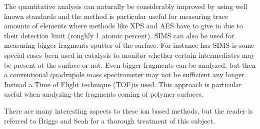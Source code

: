 The quantitative analysis can naturally be considerably improved by using well known standards and the method is particular useful for measuring trace amounts of elements where methods like XPS and AES have  to give in due to their detection limit (roughly 1 atomic percent). SIMS can also be used for measuring bigger fragments sputter of the surface. For instance has SIMS is some special cases been used in catalysis to monitor whether certain intermediates may be present at the surface or not. Even bigger fragments can be analyzed, but then a conventional quadrupole mass spectrometer may not be sufficient any longer. Instead a Time of Flight technique (TOF)is used. This approach is particular useful when analyzing the fragments coming of polymer surfaces.


There are many interesting aspects to these ion based methods, but the reader is referred to Briggs and Seah for a thorough treatment \cite{briggs2} of this subject.


